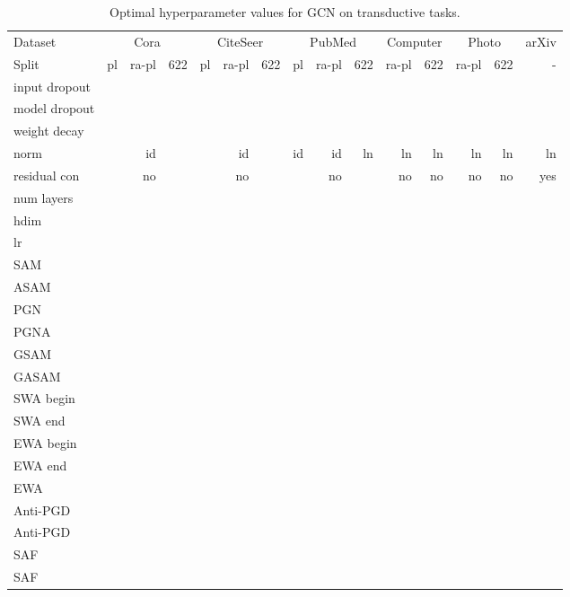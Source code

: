 \documentclass[runningheads]{llncs}
\begin{document}
\begin{table*}[!hb]
    \centering   
        \caption{Optimal hyperparameter values for GCN on transductive tasks.}
    \label{tab:gcn_params}
    \tiny
    \begin{tabular}{l|r r r | r r r | r r r | r r | r r| r }\toprule
    Dataset       & \multicolumn{3}{c|}{Cora} & \multicolumn{3}{c|}{CiteSeer} & \multicolumn{3}{c|}{PubMed} & \multicolumn{2}{c|}{Computer} & \multicolumn{2}{c|}{Photo} & arXiv \\
    Split         & pl & ra-pl & 622 & pl & ra-pl & 622 & pl & ra-pl & 622 & ra-pl & 622 & ra-pl & 622 &- \\ \midrule
    input dropout &  &  &  &  &  &  &  &  &  &  &  &  &  &   \\
    model dropout &  &  &  &  &  &  &  &  &  &  &  &  &  &   \\
    weight decay  &  &  &  &  &  &  &  &  &  &  &  &  &  &  \\
    norm          & & id & & & id & & id & id & ln & ln & ln & ln & ln & ln \\
    residual con  & & no & & & no & & & no & & no & no & no & no & yes  \\
    num layers    & &  & & &  & & &  & &  &  &  &  &   \\
    hdim          & &  & & &  & &  &  &  &  &  &  &  &  \\
    lr            &  &  &  &  &  &  &  &  &  &  &  &  &  &   \\ \midrule
    SAM     &  &  &  &  &  &  &  &  &  &  &  &  &  &   \\
    ASAM    &  &  &  &  &  &  &  &  &  &  &  &  &  &   \\
    PGN   &  &  &  &   &  &   &   &  &  &  &  &  &  &   \\
    PGNA  &  &  &  &   &  &   &   &  &  &  &  &  &  &   \\
    GSAM  &  &  &  &   &  &   &  &  &  &  &  &  &  &  \\
    GASAM  &  &  &  &   &  &   &  &  &   &  &  &  &  &   \\
    SWA begin     &  &  &  & &  & &  &  &  &  &  &  &  &  \\
    SWA end       &  &  &  &  &  &  &  &  &  &  &  &  &  &   \\
    EWA begin     & &  & & &  & & &  & &  &  &  &  &   \\
    EWA end       & &  & &  &  &  &  &  &  &  &  &  &  &   \\
    EWA   &  &  &  &  &  &  &  &  &  &  &  &  &  &   \\
    Anti-PGD   &  &  &  &  &  &  &  &  &  &  &  &  &  &   \\
    Anti-PGD   & &  & &  &  &  &  &  &  &  &  &  &  &   \\
    SAF  &  &  &  &   &  &   & &  & &  &  &  &  &   \\
    SAF     &  &  &  &  &  &  &   &  &  &  &  &  &  &   \\
    \bottomrule
    \end{tabular}

\end{table*}
\end{document}
